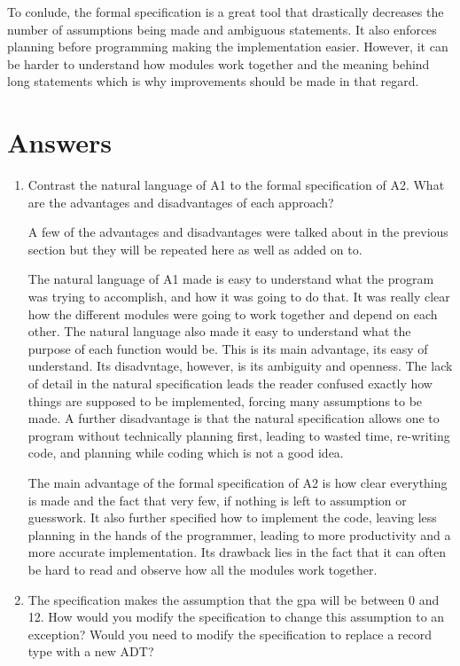 \documentclass[12pt]{article}
\begin{document}
To conlude, the formal specification is a great tool that drastically
decreases the number of assumptions being made and ambiguous statements.
It also enforces planning before programming making the implementation easier.
However, it can be harder to understand how modules work together and the meaning
behind long statements which is why improvements should be made in that regard.

\section{Answers}

\begin{enumerate}

\item Contrast the natural language of A1 to the formal specification of A2.
What are the advantages and disadvantages of each approach?

A few of the advantages and disadvantages were talked about in the previous
section but they will be repeated here as well as added on to.

The natural language of A1 made is easy to understand what the program was
trying to accomplish, and how it was going to do that. It was really clear
how the different modules were going to work together and depend on each
other. The natural language also made it easy to understand what the purpose
of each function would be. This is its main advantage, its easy of understand.
Its disadvntage, however, is its ambiguity and openness. The lack of detail
in the natural specification leads the reader confused exactly how things
are supposed to be implemented, forcing many assumptions to be made. A further
disadvantage is that the natural specification allows one to program without
technically planning first, leading to wasted time, re-writing code,
and planning while coding which is not a good idea.

The main advantage of the formal specification of A2 is how clear everything is
made and the fact that very few, if nothing is left to assumption or guesswork.
It also further specified how to implement the code, leaving less planning
in the hands of the programmer, leading to more productivity and a more accurate
implementation. Its drawback lies in the fact that it can often be hard to read
and observe how all the modules work together.

\item The specification makes the assumption that the gpa will be between 0 and 12.
How would you modify the specification to change this assumption to an exception?
Would you need to modify the specification to replace a record type with a new ADT?


\end{enumerate}
\end{document}
